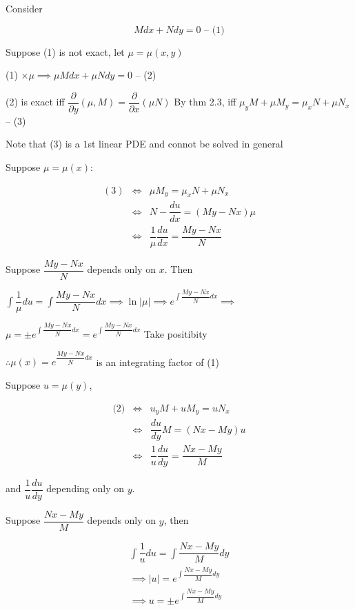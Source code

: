 Consider

$$Mdx + Ndy = 0 \text{ -- (1)}$$

Suppose (1) is not exact, let $\mu = \mu (x,y)$

(1) $\times \mu \implies \mu M dx + \mu N dy = 0$ -- (2)

(2) is exact iff $\dfrac{\partial}{\partial y}(\mu , M) = \dfrac{\partial}{\partial x}(\mu N)$ By thm 2.3, iff $\mu_y M + \mu M_y= \mu_xN + \mu N_x$ -- (3)

Note that (3) is a $1$st linear PDE and connot be solved in general

Suppose $\mu = \mu(x):$

\begin{eqnarray*}
	(3) &\Leftrightarrow& \mu M_y =  \mu_x N + \mu N_x\\
	&\Leftrightarrow & N - \dfrac{du}{dx} = (My - Nx)\mu\\
	&\Leftrightarrow & \dfrac{1}{\mu}\dfrac{du}{dx} = \dfrac{My - Nx}{N}
\end{eqnarray*}

Suppose $\dfrac{My - Nx}{N}$ depends only on $x$. Then

$\int \dfrac{1}{\mu}du = \int \dfrac{My - Nx}{N}dx \implies \ln|\mu| \implies e^{\int \dfrac{My - Nx}{N}dx} \implies$

$\mu = \pm e^{\int \dfrac{My - Nx}{N}dx} = e^{\int \dfrac{My - Nx}{N}dx}$ Take positibity

$\therefore \mu(x) = e^{\dfrac{My - Nx}{N}dx}$ is an integrating factor of (1)

Suppose $u = \mu(y)$,

\begin{eqnarray*}
	\text{(2)} &\Leftrightarrow & u_yM + u M_y = u N_x\\
	&\Leftrightarrow & \dfrac{du}{dy}M = (Nx - My)u\\
	&\Leftrightarrow & \dfrac{1}{u}\dfrac{du}{dy} = \dfrac{Nx - My}{M}
\end{eqnarray*}

and $\dfrac{1}{u}\dfrac{du}{dy}$ depending only on $y$.

Suppose $\dfrac{Nx - My}{M}$ depends only on $y$, then

\begin{eqnarray*}
	\int \dfrac{1}{u}du = \int \dfrac{Nx - My}{M}dy\\
	\implies |u| = e^{\int \dfrac{Nx - My}{M}dy}\\
	\implies u = \pm e^{\int \dfrac{Nx - My}{M}dy}
\end{eqnarray*}

